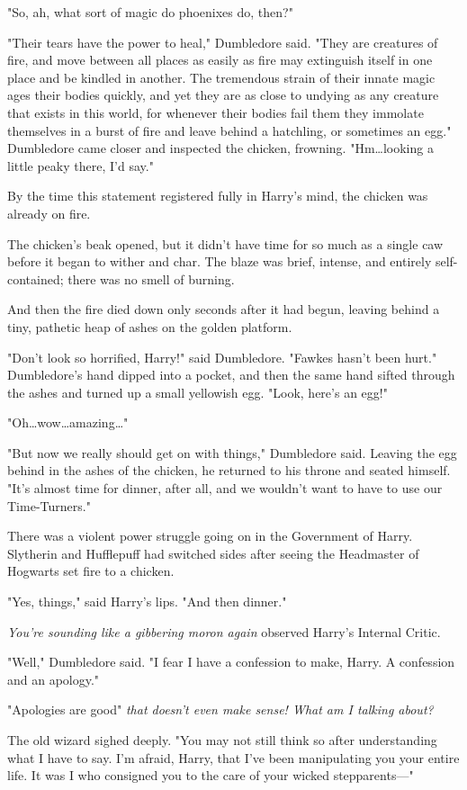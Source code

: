 "So, ah, what sort of magic do phoenixes do, then?"

"Their tears have the power to heal," Dumbledore said. "They are creatures of
fire, and move between all places as easily as fire may extinguish itself in
one place and be kindled in another. The tremendous strain of their innate
magic ages their bodies quickly, and yet they are as close to undying as any
creature that exists in this world, for whenever their bodies fail them they
immolate themselves in a burst of fire and leave behind a hatchling, or
sometimes an egg." Dumbledore came closer and inspected the chicken, frowning.
"Hm…looking a little peaky there, I’d say."

By the time this statement registered fully in Harry’s mind, the chicken was
already on fire.

The chicken’s beak opened, but it didn’t have time for so much as a single caw
before it began to wither and char. The blaze was brief, intense, and entirely
self-contained; there was no smell of burning.

And then the fire died down only seconds after it had begun, leaving behind a
tiny, pathetic heap of ashes on the golden platform.

"Don’t look so horrified, Harry!" said Dumbledore. "Fawkes hasn’t been hurt."
Dumbledore’s hand dipped into a pocket, and then the same hand sifted through
the ashes and turned up a small yellowish egg. "Look, here’s an egg!"

"Oh…wow…amazing…"

"But now we really should get on with things," Dumbledore said. Leaving the egg
behind in the ashes of the chicken, he returned to his throne and seated
himself. "It’s almost time for dinner, after all, and we wouldn’t want to have
to use our Time-Turners."

There was a violent power struggle going on in the Government of Harry.
Slytherin and Hufflepuff had switched sides after seeing the Headmaster of
Hogwarts set fire to a chicken.

"Yes, things," said Harry’s lips. "And then dinner."

\emph{You’re sounding like a gibbering moron again} observed Harry’s Internal
Critic.

"Well," Dumbledore said. "I fear I have a confession to make, Harry. A
confession and an apology."

"Apologies are good" \emph{that doesn’t even make sense! What am I talking
about?}

The old wizard sighed deeply. "You may not still think so after understanding
what I have to say. I’m afraid, Harry, that I’ve been manipulating you your
entire life. It was I who consigned you to the care of your wicked
stepparents—"

